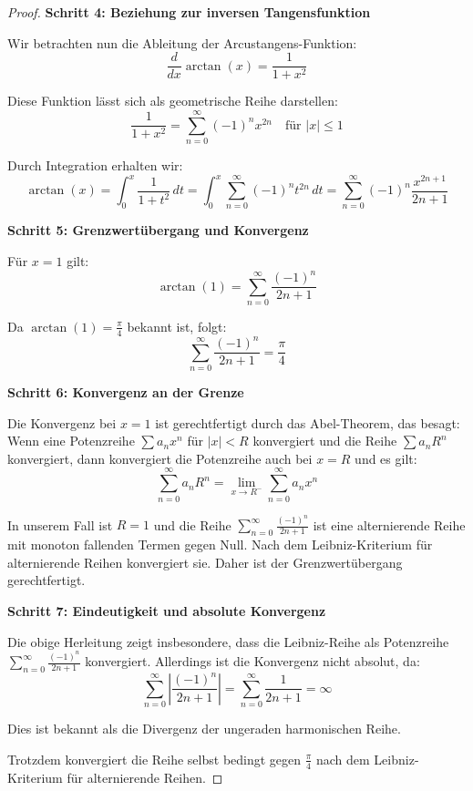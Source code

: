 \documentclass[a4paper,12pt,twoside]{report}
\theoremstyle{definition}
\begin{document}
\begin{proof}
\textbf{Schritt 4: Beziehung zur inversen Tangensfunktion}

Wir betrachten nun die Ableitung der Arcustangens-Funktion:
\begin{equation}
\frac{d}{dx} \arctan(x) = \frac{1}{1+x^2}
\end{equation}

Diese Funktion lässt sich als geometrische Reihe darstellen:
\begin{equation}
\frac{1}{1+x^2} = \sum_{n=0}^{\infty} (-1)^n x^{2n} \quad \text{für } |x| \leq 1
\end{equation}

Durch Integration erhalten wir:
\begin{equation}
\arctan(x) = \int_0^x \frac{1}{1+t^2} \, dt = \int_0^x \sum_{n=0}^{\infty} (-1)^n t^{2n} \, dt = \sum_{n=0}^{\infty} (-1)^n \frac{x^{2n+1}}{2n+1}
\end{equation}

\textbf{Schritt 5: Grenzwertübergang und Konvergenz}

Für $x = 1$ gilt:
\begin{equation}
\arctan(1) = \sum_{n=0}^{\infty} \frac{(-1)^n}{2n+1}
\end{equation}

Da $\arctan(1) = \frac{\pi}{4}$ bekannt ist, folgt:
\begin{equation}
\sum_{n=0}^{\infty} \frac{(-1)^n}{2n+1} = \frac{\pi}{4}
\end{equation}

\textbf{Schritt 6: Konvergenz an der Grenze}

Die Konvergenz bei $x = 1$ ist gerechtfertigt durch das Abel-Theorem, das besagt: Wenn eine Potenzreihe $\sum a_n x^n$ für $|x| < R$ konvergiert und die Reihe $\sum a_n R^n$ konvergiert, dann konvergiert die Potenzreihe auch bei $x = R$ und es gilt:
\begin{equation}
\sum_{n=0}^{\infty} a_n R^n = \lim_{x \to R^-} \sum_{n=0}^{\infty} a_n x^n
\end{equation}

In unserem Fall ist $R = 1$ und die Reihe $\sum_{n=0}^{\infty} \frac{(-1)^n}{2n+1}$ ist eine alternierende Reihe mit monoton fallenden Termen gegen Null. Nach dem Leibniz-Kriterium für alternierende Reihen konvergiert sie. Daher ist der Grenzwertübergang gerechtfertigt.

\textbf{Schritt 7: Eindeutigkeit und absolute Konvergenz}

Die obige Herleitung zeigt insbesondere, dass die Leibniz-Reihe als Potenzreihe $\sum_{n=0}^{\infty} \frac{(-1)^n}{2n+1}$ konvergiert. Allerdings ist die Konvergenz nicht absolut, da:
\begin{equation}
\sum_{n=0}^{\infty} \left|\frac{(-1)^n}{2n+1}\right| = \sum_{n=0}^{\infty} \frac{1}{2n+1} = \infty
\end{equation}

Dies ist bekannt als die Divergenz der ungeraden harmonischen Reihe.

Trotzdem konvergiert die Reihe selbst bedingt gegen $\frac{\pi}{4}$ nach dem Leibniz-Kriterium für alternierende Reihen.
\end{proof}
\end{document}
